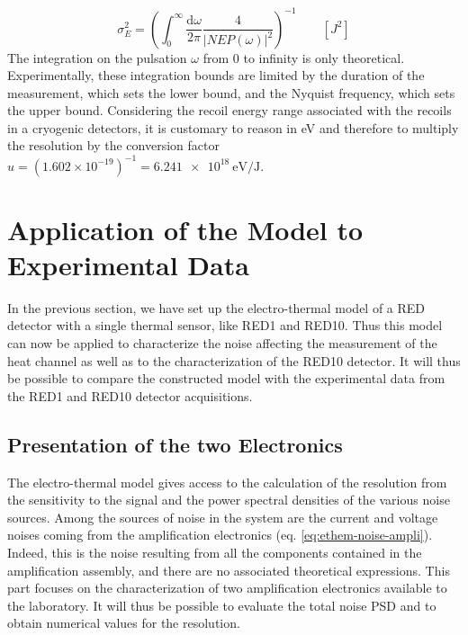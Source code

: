 \begin{equation}
\label{eq:resolution}
\displaystyle{ \sigma_E^2 = \left( \int_{0}^{\infty} \frac{\mathrm{d}\omega}{2\pi}\frac{4}{|NEP(\omega)|^2}\right)^{-1} } \qquad [J^2]
\end{equation}
The integration on the pulsation $\omega$ from $0$ to infinity is only theoretical. Experimentally, these integration bounds are limited by the duration of the measurement, which sets the lower bound, and the Nyquist frequency, which sets the upper bound. 
Considering the recoil energy range associated with the recoils in a cryogenic detectors, it is customary to reason in \si{eV} and therefore to multiply the resolution by the conversion factor $u=(1.602\times 10^{-19})^{-1} = \SI{6.241e18}{\eV\per\joule}$.


\section{Application of the Model to Experimental Data}

In the previous section, we have set up the electro-thermal model of a RED detector with a single thermal sensor, like RED1 and RED10. Thus this model can now be applied to characterize the noise affecting the measurement of the heat channel as well as to the characterization of the RED10 detector. It will thus be possible to compare the constructed model with the experimental data from the RED1 and RED10 detector acquisitions.

\subsection{Presentation of the two Electronics}

 The electro-thermal model gives access to the calculation of the resolution from the sensitivity to the signal and the power spectral densities of the various noise sources. Among the sources of noise in the system are the current and voltage noises coming from the amplification electronics (eq. \ref{eq:ethem-noise-ampli}). Indeed, this is the noise resulting from all the components contained in the amplification assembly, and there are no associated theoretical expressions. This part focuses on the characterization of two amplification electronics available to the laboratory. It will thus be possible to evaluate the total noise PSD and to obtain numerical values for the resolution.

